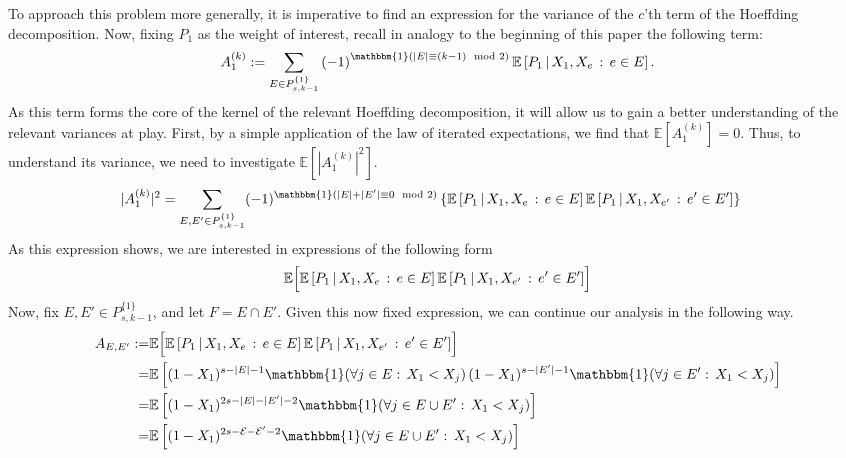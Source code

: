 \documentclass[letterpaper,10pt]{article}
\numberwithin{equation}{section}
\numberwithin{thm}{section}
\numberwithin{lem}{section}
\numberwithin{cor}{section}
\newcommand{\1}{\mathbb{1}}
\begin{document}
To approach this problem more generally, it is imperative to find an expression for the variance of the $c$'th term of the Hoeffding decomposition.
Now, fixing $P_1$ as the weight of interest, recall in analogy to the beginning of this paper the following term:
\begin{equation*}
	A_1^{(k)}
	:= \sum_{E \in P_{s,k-1}^{\{1\}}} \left(-1\right)^{\mathbbm{1}\left(|E| \equiv (k-1) \mod 2\right)} \mathbb{E}\left[P_1 \, | \, X_1, X_e \, : \, e \in E\right].
\end{equation*}
As this term forms the core of the kernel of the relevant Hoeffding decomposition, it will allow us to gain a better understanding of the relevant variances at play.
First, by a simple application of the law of iterated expectations, we find that $\mathbb{E}[A_1^{(k)}] = 0$.
Thus, to understand its variance, we need to investigate $\mathbb{E}\left[|A_1^{(k)}|^2\right]$.
\begin{equation*}
	\begin{aligned}
		|A_1^{(k)}|^2
		 & = \sum_{E, E' \in P_{s,k-1}^{\{1\}}}
		(-1)^{\mathbbm{1}(|E| + | E'| \equiv 0 \mod 2)}
		\left\{\mathbb{E}\left[P_1 \, | \, X_1, X_e \, : \, e \in E\right] \mathbb{E}\left[P_1 \, | \, X_1, X_{e'} \, : \, e' \in E'\right]\right\}
	\end{aligned}
\end{equation*}
As this expression shows, we are interested in expressions of the following form
\begin{equation*}
	\begin{aligned}
		\mathbb{E}\Bigl[\mathbb{E}\left[P_1 \, | \, X_1, X_e \, : \, e \in E\right] \mathbb{E}\left[P_1 \, | \, X_1, X_{e'} \, : \, e' \in E'\right]\Bigr]
	\end{aligned}
\end{equation*}
Now, fix $E, E' \in P_{s,k-1}^{\{1\}}$, and let $F = E \cap E'$.
Given this now fixed expression, we can continue our analysis in the following way.
\begin{equation*}
	\begin{aligned}
		A_{E, E'}
		:= & \mathbb{E}\Bigl[\mathbb{E}\left[P_1 \, | \, X_1, X_e \, : \, e \in E\right] \mathbb{E}\left[P_1 \, | \, X_1, X_{e'} \, : \, e' \in E'\right]\Bigr]        \\
		=  & \mathbb{E}\left[(1 - X_1)^{s-|E|-1} \mathbbm{1}(\forall j \in E: \, X_1 < X_j) \, (1 - X_1)^{s-|E'|-1} \mathbbm{1}(\forall j \in E': \, X_1 < X_j)\right] \\
		=  & \mathbb{E}\left[(1-X_1)^{2s - |E| - |E'| - 2}\mathbbm{1}(\forall j \in E \cup E': \, X_1 < X_j)\right]                                                    \\
		=  & \mathbb{E}\left[(1-X_1)^{2s - \mathcal{E} - \mathcal{E}' - 2}\mathbbm{1}(\forall j \in E \cup E': \, X_1 < X_j)\right]
	\end{aligned}
\end{equation*}
\end{document}
